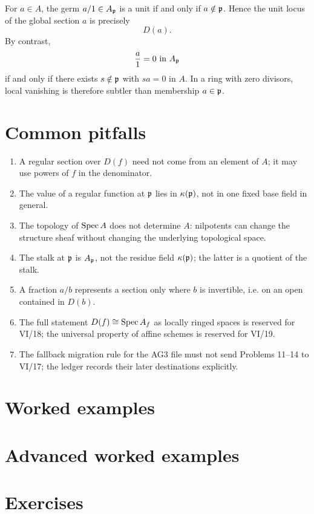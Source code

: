 For $a\in A$, the germ $a/1\in A_{\mathfrak p}$ is a unit if and only if
$a\notin\mathfrak p$.  Hence the unit locus of the global section $a$ is precisely
\[
D(a).
\]
By contrast,
\[
\frac a1=0\text{ in }A_{\mathfrak p}
\]
if and only if there exists $s\notin\mathfrak p$ with $sa=0$ in $A$.  In a ring with zero
divisors, local vanishing is therefore subtler than membership $a\in\mathfrak p$.

\section{Common pitfalls}
\begin{enumerate}
\item A regular section over $D(f)$ need not come from an element of $A$; it may use powers
of $f$ in the denominator.
\item The value of a regular function at $\mathfrak p$ lies in $\kappa(\mathfrak p)$, not in one fixed
base field in general.
\item The topology of $\operatorname{Spec} A$ does not determine $A$: nilpotents can change the structure
sheaf without changing the underlying topological space.
\item The stalk at $\mathfrak p$ is $A_{\mathfrak p}$, not the residue field $\kappa(\mathfrak p)$; the latter is
a quotient of the stalk.
\item A fraction $a/b$ represents a section only where $b$ is invertible, i.e. on an open
contained in $D(b)$.
\item The full statement $D(f)\cong\operatorname{Spec} A_f$ as locally ringed spaces is reserved for
VI/18; the universal property of affine schemes is reserved for VI/19.
\item The fallback migration rule for the AG3 file must not send Problems 11--14 to
VI/17; the ledger records their later destinations explicitly.
\end{enumerate}

\section{Worked examples}


\section{Advanced worked examples}


\section{Exercises}

\ifdefined\IncludeExerciseHints

\fi

